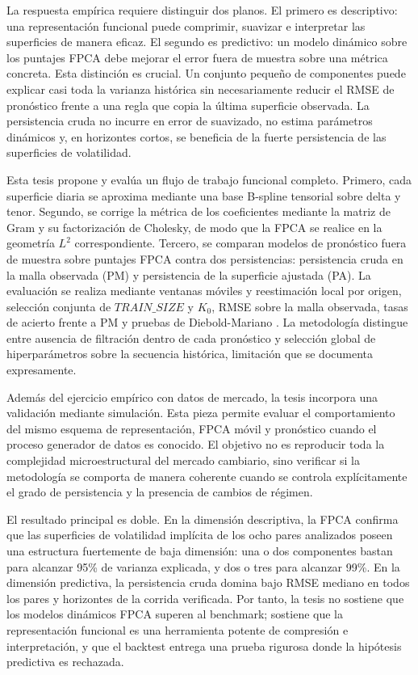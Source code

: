 \documentclass[a4paper,11pt]{article}
\newcommand{\SVIs}{superficies de volatilidad implícita}
\begin{document}
La respuesta empírica requiere distinguir dos planos. El primero es descriptivo: una representación funcional puede comprimir, suavizar e interpretar las superficies de manera eficaz. El segundo es predictivo: un modelo dinámico sobre los puntajes FPCA debe mejorar el error fuera de muestra sobre una métrica concreta. Esta distinción es crucial. Un conjunto pequeño de componentes puede explicar casi toda la varianza histórica sin necesariamente reducir el RMSE de pronóstico frente a una regla que copia la última superficie observada. La persistencia cruda no incurre en error de suavizado, no estima parámetros dinámicos y, en horizontes cortos, se beneficia de la fuerte persistencia de las superficies de volatilidad.

Esta tesis propone y evalúa un flujo de trabajo funcional completo. Primero, cada superficie diaria se aproxima mediante una base B-spline tensorial sobre delta y tenor. Segundo, se corrige la métrica de los coeficientes mediante la matriz de Gram y su factorización de Cholesky, de modo que la FPCA se realice en la geometría \(L^2\) correspondiente. Tercero, se comparan modelos de pronóstico fuera de muestra sobre puntajes FPCA contra dos persistencias: persistencia cruda en la malla observada (PM) y persistencia de la superficie ajustada (PA). La evaluación se realiza mediante ventanas móviles y reestimación local por origen, selección conjunta de \(TRAIN\_SIZE\) y \(K_0\), RMSE sobre la malla observada, tasas de acierto frente a PM y pruebas de Diebold-Mariano \cite{DieboldMariano1995}. La metodología distingue entre ausencia de filtración dentro de cada pronóstico y selección global de hiperparámetros sobre la secuencia histórica, limitación que se documenta expresamente.

Además del ejercicio empírico con datos de mercado, la tesis incorpora una validación mediante simulación. Esta pieza permite evaluar el comportamiento del mismo esquema de representación, FPCA móvil y pronóstico cuando el proceso generador de datos es conocido. El objetivo no es reproducir toda la complejidad microestructural del mercado cambiario, sino verificar si la metodología se comporta de manera coherente cuando se controla explícitamente el grado de persistencia y la presencia de cambios de régimen.

El resultado principal es doble. En la dimensión descriptiva, la FPCA confirma que las \SVIs{} de los ocho pares analizados poseen una estructura fuertemente de baja dimensión: una o dos componentes bastan para alcanzar 95\% de varianza explicada, y dos o tres para alcanzar 99\%. En la dimensión predictiva, la persistencia cruda domina bajo RMSE mediano en todos los pares y horizontes de la corrida verificada. Por tanto, la tesis no sostiene que los modelos dinámicos FPCA superen al benchmark; sostiene que la representación funcional es una herramienta potente de compresión e interpretación, y que el backtest entrega una prueba rigurosa donde la hipótesis predictiva es rechazada.
\end{document}

